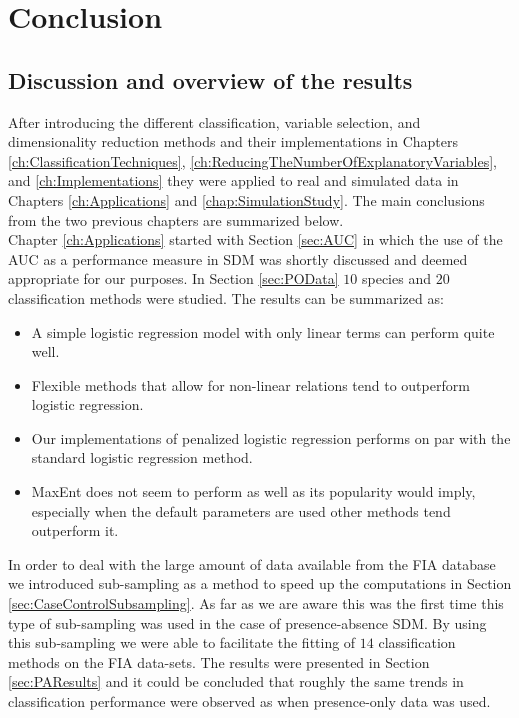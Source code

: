 \chapter{Conclusion}
\label{ch:Conclussion}
\section{Discussion and overview of the results}
After introducing the different classification, variable selection, and dimensionality reduction methods and their implementations in Chapters \ref{ch:ClassificationTechniques}, \ref{ch:ReducingTheNumberOfExplanatoryVariables}, and \ref{ch:Implementations} they were applied to real and simulated data in Chapters \ref{ch:Applications} and \ref{chap:SimulationStudy}. The main conclusions from the two previous chapters are summarized below. \\

Chapter \ref{ch:Applications} started with Section \ref{sec:AUC} in which the use of the AUC as a performance measure in SDM was shortly discussed and deemed appropriate for our purposes. In Section \ref{sec:POData} $10$ species and $20$ classification methods were studied. The results can be summarized as:
\begin{itemize}
\item A simple logistic regression model with only linear terms can perform quite well.
\item Flexible methods that allow for non-linear relations tend to outperform logistic regression.
\item Our implementations of penalized logistic regression performs on par with the standard logistic regression method.
\item MaxEnt does not seem to perform as well as its popularity would imply, especially when the default parameters are used other methods tend outperform it.
\end{itemize}

In order to deal with the large amount of data available from the FIA database we introduced sub-sampling as a method to speed up the computations in Section \ref{sec:CaseControlSubsampling}. As far as we are aware this was the first time this type of sub-sampling was used in the case of presence-absence SDM. By using this sub-sampling we were able to facilitate the fitting of $14$ classification methods on the FIA data-sets. The results were presented in Section \ref{sec:PAResults} and it could be concluded that roughly the same trends in classification performance were observed as when presence-only data was used. \\

